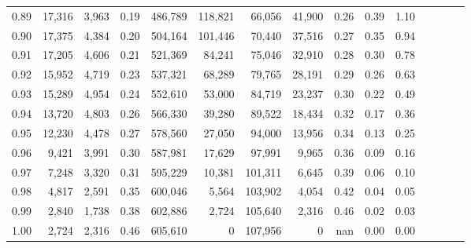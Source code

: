 \begin{tabular}{rrrcrrrrrrrrrrr}
0.89 &  17,316 &  3,963 &                                       0.19 &  486,789 &  118,821 &   66,056 &   41,900 &  0.26 &  0.39 &                         1.10 \\
0.90 &  17,375 &  4,384 &                                       0.20 &  504,164 &  101,446 &   70,440 &   37,516 &  0.27 &  0.35 &                         0.94 \\
0.91 &  17,205 &  4,606 &                                       0.21 &  521,369 &   84,241 &   75,046 &   32,910 &  0.28 &  0.30 &                         0.78 \\
0.92 &  15,952 &  4,719 &                                       0.23 &  537,321 &   68,289 &   79,765 &   28,191 &  0.29 &  0.26 &                         0.63 \\
0.93 &  15,289 &  4,954 &                                       0.24 &  552,610 &   53,000 &   84,719 &   23,237 &  0.30 &  0.22 &                         0.49 \\
0.94 &  13,720 &  4,803 &                                       0.26 &  566,330 &   39,280 &   89,522 &   18,434 &  0.32 &  0.17 &                         0.36 \\
0.95 &  12,230 &  4,478 &                                       0.27 &  578,560 &   27,050 &   94,000 &   13,956 &  0.34 &  0.13 &                         0.25 \\
0.96 &   9,421 &  3,991 &                                       0.30 &  587,981 &   17,629 &   97,991 &    9,965 &  0.36 &  0.09 &                         0.16 \\
0.97 &   7,248 &  3,320 &                                       0.31 &  595,229 &   10,381 &  101,311 &    6,645 &  0.39 &  0.06 &                         0.10 \\
0.98 &   4,817 &  2,591 &                                       0.35 &  600,046 &    5,564 &  103,902 &    4,054 &  0.42 &  0.04 &                         0.05 \\
0.99 &   2,840 &  1,738 &                                       0.38 &  602,886 &    2,724 &  105,640 &    2,316 &  0.46 &  0.02 &                         0.03 \\
1.00 &   2,724 &  2,316 &                                       0.46 &  605,610 &        0 &  107,956 &        0 &   nan &  0.00 &                         0.00 \\
\bottomrule
\end{tabular}
